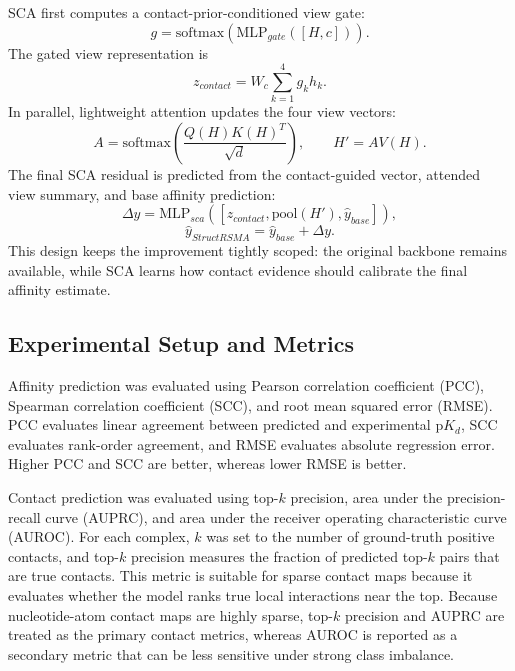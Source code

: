 \documentclass[journal=jcisd8,manuscript=article]{achemso}
\begin{document}
SCA first computes a contact-prior-conditioned view gate:
\begin{equation}
g=\mathrm{softmax}(\mathrm{MLP}_{gate}([H,c])).
\end{equation}
The gated view representation is
\begin{equation}
z_{contact}=W_c\sum_{k=1}^{4} g_k h_k.
\end{equation}
In parallel, lightweight attention updates the four view vectors:
\begin{equation}
A=\mathrm{softmax}\left(\frac{Q(H)K(H)^T}{\sqrt{d}}\right), \qquad
H' = A V(H).
\end{equation}
The final SCA residual is predicted from the contact-guided vector, attended view summary, and base affinity prediction:
\begin{equation}
\Delta y = \mathrm{MLP}_{sca}([z_{contact},\mathrm{pool}(H'),\hat{y}_{base}]),
\end{equation}
\begin{equation}
\hat{y}_{StructRSMA} = \hat{y}_{base} + \Delta y.
\end{equation}
This design keeps the improvement tightly scoped: the original backbone remains available, while SCA learns how contact evidence should calibrate the final affinity estimate.

\subsection{Experimental Setup and Metrics}

Affinity prediction was evaluated using Pearson correlation coefficient (PCC), Spearman correlation coefficient (SCC), and root mean squared error (RMSE). PCC evaluates linear agreement between predicted and experimental p$K_d$, SCC evaluates rank-order agreement, and RMSE evaluates absolute regression error. Higher PCC and SCC are better, whereas lower RMSE is better.

Contact prediction was evaluated using top-$k$ precision, area under the precision-recall curve (AUPRC), and area under the receiver operating characteristic curve (AUROC). For each complex, $k$ was set to the number of ground-truth positive contacts, and top-$k$ precision measures the fraction of predicted top-$k$ pairs that are true contacts. This metric is suitable for sparse contact maps because it evaluates whether the model ranks true local interactions near the top. Because nucleotide-atom contact maps are highly sparse, top-$k$ precision and AUPRC are treated as the primary contact metrics, whereas AUROC is reported as a secondary metric that can be less sensitive under strong class imbalance.
\end{document}
